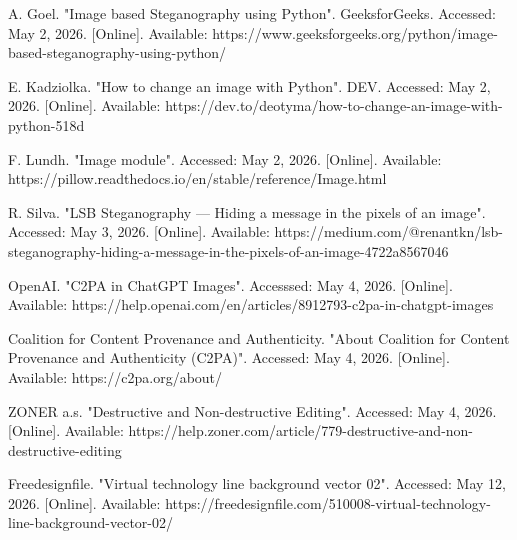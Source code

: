 \documentclass[titlepage]{article}
\begin{document}
    \vspace{0.5em}

    A. Goel. "Image based Steganography using Python". GeeksforGeeks.
    Accessed: May 2, 2026. [Online]. Available:
    https://www.geeksforgeeks.org/python/image-based-steganography-using-python/

    \vspace{0.5em}

    E. Kadziolka. "How to change an image with Python". DEV. Accessed: May
    2, 2026. [Online]. Available:
    https://dev.to/deotyma/how-to-change-an-image-with-python-518d

    \vspace{0.5em}

    F. Lundh. "Image module". Accessed: May 2, 2026. [Online].
    Available: https://pillow.readthedocs.io/en/stable/reference/Image.html

    \vspace{0.5em}

    R. Silva. "LSB Steganography --- Hiding a message in the pixels of an
    image". Accessed: May 3, 2026. [Online]. Available:
    https://medium.com/@renantkn/lsb-steganography-hiding-a-message-in-the-pixels-of-an-image-4722a8567046

    \vspace{0.5em}

    OpenAI. "C2PA in ChatGPT Images". Accesssed: May 4, 2026.
    [Online]. Available:
    https://help.openai.com/en/articles/8912793-c2pa-in-chatgpt-images

    \vspace{0.5em}

    Coalition for Content Provenance and Authenticity. "About Coalition for
    Content Provenance and Authenticity (C2PA)". Accessed: May 4, 2026.
    [Online]. Available: https://c2pa.org/about/

    \vspace{0.5em}

    ZONER a.s. "Destructive and Non-destructive Editing". Accessed: May 4,
    2026. [Online]. Available:
    https://help.zoner.com/article/779-destructive-and-non-destructive-editing

    \vspace{0.5em}

    Freedesignfile. "Virtual technology line background vector 02".
    Accessed: May 12, 2026. [Online]. Available:
    https://freedesignfile.com/510008-virtual-technology-line-background-vector-02/
\end{document}

